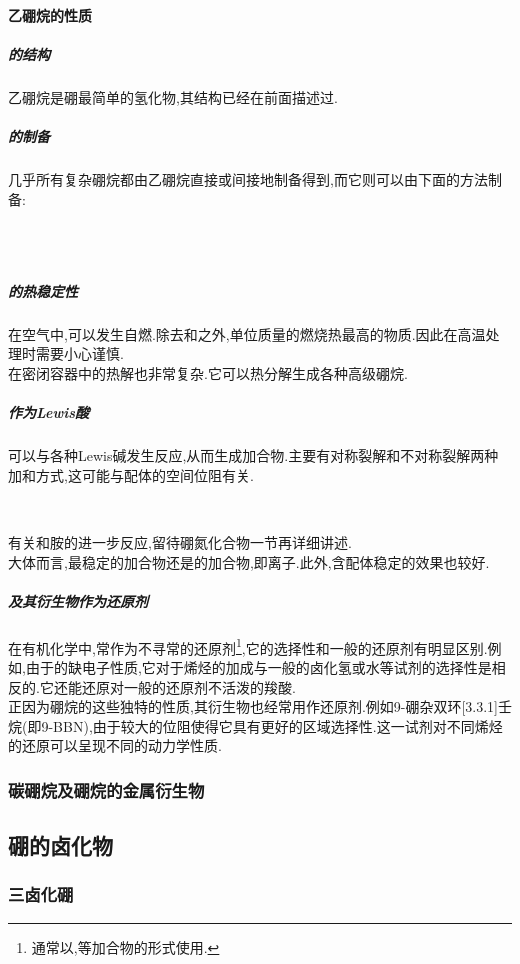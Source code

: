 \documentclass{ctexart}
\begin{document}
\paragraph{乙硼烷的性质}
\subparagraph{的结构}
乙硼烷是硼最简单的氢化物,其结构已经在前面描述过.
\subparagraph{的制备}几乎所有复杂硼烷都由乙硼烷直接或间接地制备得到,而它则可以由下面的方法制备:
\begin{center}
    \\
    \\
\end{center}
\subparagraph{的热稳定性}
在空气中,可以发生自燃.除去和之外,单位质量的燃烧热最高的物质.因此在高温处理时需要小心谨慎.\\
\indent {}在密闭容器中的热解也非常复杂.它可以热分解生成各种高级硼烷.
\subparagraph{作为Lewis酸}
可以与各种Lewis碱发生反应,从而生成加合物.主要有对称裂解和不对称裂解两种加和方式,这可能与配体的空间位阻有关.
\begin{center}
    \\
\end{center}
有关和胺的进一步反应,留待硼氮化合物一节再详细讲述.\\
\indent 大体而言,最稳定的加合物还是的加合物,即离子.此外,含配体稳定的效果也较好.
\subparagraph{及其衍生物作为还原剂}
在有机化学中,常作为不寻常的还原剂\footnote{通常以,等加合物的形式使用.},它的选择性和一般的还原剂有明显区别.例如,由于的缺电子性质,它对于烯烃的加成与一般的卤化氢或水等试剂的选择性是相反的.它还能还原对一般的还原剂不活泼的羧酸.\\
\indent 正因为硼烷的这些独特的性质,其衍生物也经常用作还原剂.例如9-硼杂双环[3.3.1]壬烷(即9-BBN),由于较大的位阻使得它具有更好的区域选择性.这一试剂对不同烯烃的还原可以呈现不同的动力学性质.
\subsubsection{碳硼烷及硼烷的金属衍生物}
\subsection{硼的卤化物}
\subsubsection{三卤化硼}
\end{document}
